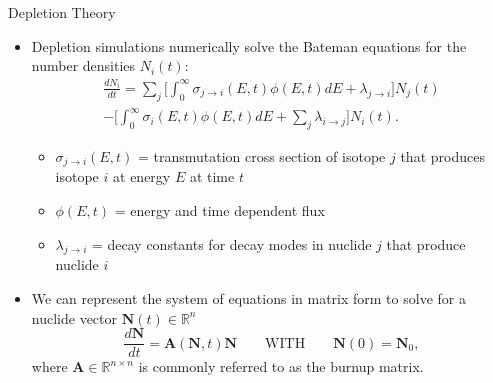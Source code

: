 \documentclass[9pt,t,aspectratio=169]{beamer}
\newcommand{\QWITH}{\qquad \text{WITH} \qquad}
\begin{document}
\begin{frame}{Depletion Theory}
    \pause
    \begin{itemize}
        \item<2-> Depletion simulations numerically solve the Bateman equations for the number densities $N_{i}(t)$:
        \begin{multline} \label{eq:batemen}
            \frac{dN_{i}}{dt} =
            \sum_{j} \bigg[\int_{0}^{\infty} \sigma_{j\rightarrow{i}}(E,t)\phi(E,t)dE + \lambda_{j\rightarrow{i}}\bigg]N_{j}(t) \\
            -\bigg[\int_{0}^{\infty} \sigma_{i}(E,t)\phi(E,t)dE
            +\sum_{j}\lambda_{i\rightarrow{j}}\bigg] N_{i}(t).
        \end{multline}
        \begin{itemize}
            \item<3-> $\sigma_{j\rightarrow{i}}(E,t)$ = transmutation cross section of isotope $j$ that produces isotope $i$ at energy $E$ at time $t$
            \item<4-> $\phi(E,t)$ = energy and time dependent flux
            \item<5-> $\lambda_{j\rightarrow{i}}$ = decay constants for decay modes in nuclide $j$ that produce nuclide $i$
        \end{itemize}
        \item<6-> We can represent the system of equations in matrix form to solve for a nuclide vector $\textbf{N}(t)\in\mathbb{R}^{n}$
        \begin{equation} \label{eq:burnup matrix odes}
            \frac{d\textbf{N}}{dt} =
            \textbf{A}(\textbf{N},t) \textbf{N}
            \QWITH
            \textbf{N}(0) = \textbf{N}_{0},
        \end{equation}
        where $\textbf{A}\in\mathbb{R}^{n\times n}$ is commonly referred to as the burnup matrix.
    \end{itemize}
\end{frame}
\end{document}
